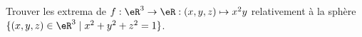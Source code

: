 
\begin{exercice}\label{exoVariete0002}

Trouver les extrema de $f: \eR^3 \rightarrow \eR : (x,y,z) \mapsto x^2y$ relativement à la sphère $\{ (x,y,z) \in \eR^3 \mid x^2 + y^2 + z^2 =1 \}$.

\end{exercice}
